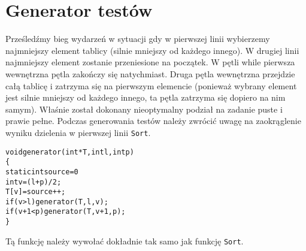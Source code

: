 \documentclass[a4paper,12pt]{article}
\begin{document}
\section{Generator testów}
Prześledźmy bieg wydarzeń w sytuacji gdy w pierwszej linii wybierzemy najmniejszy element tablicy (silnie mniejszy od każdego innego). W drugiej linii najmniejszy element zostanie przeniesione na początek. W pętli while pierwsza wewnętrzna pętla zakończy się natychmiast. Druga pętla wewnętrzna przejdzie całą tablicę i zatrzyma się na pierwszym elemencie (ponieważ wybrany element jest silnie mniejszy od każdego innego, ta pętla zatrzyma się dopiero na nim samym). Właśnie został dokonany nieoptymalny podział na zadanie puste i prawie pełne. Podczas generowania testów należy zwrócić uwagę na zaokrąglenie wyniku dzielenia w pierwszej linii \verb|Sort|.
\begin{alltt}
 void generator(int *T, int l, int p)
 \{
     static int source=0
     int v=(l+p)/2;
     T[v]=source++;
     if(v>l) generator(T,l,v);
     if(v+1<p) generator(T,v+1,p);
 \}
\end{alltt}
Tą funkcję należy wywołać dokładnie tak samo jak funkcję \verb|Sort|.
\end{document}
